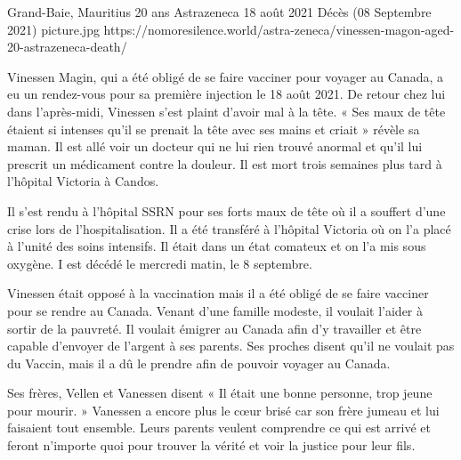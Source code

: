 {Grand-Baie, Mauritius}
{20 ans}
{Astrazeneca}
{18 août 2021}
{Décès (08 Septembre 2021)}
{picture.jpg}
{https://nomoresilence.world/astra-zeneca/vinessen-magon-aged-20-astrazeneca-death/}
{

Vinessen Magin, qui a été obligé de se faire vacciner pour voyager au Canada, a
eu un rendez-vous pour sa première injection le 18 août 2021. De retour chez lui
dans l’après-midi, Vinessen s’est plaint d’avoir mal à la tête. « Ses maux de
tête étaient si intenses qu’il se prenait la tête avec ses mains et criait »
révèle sa maman. Il est allé voir un docteur qui ne lui rien trouvé anormal et
qu’il lui prescrit un médicament contre la douleur. Il est mort trois semaines
plus tard à l’hôpital Victoria à Candos.

Il s’est rendu à l’hôpital SSRN pour ses forts maux de tête où il a souffert
d’une crise lors de l’hospitalisation. Il a été transféré à l’hôpital Victoria
où on l’a placé à l’unité des soins intensifs. Il était dans un état comateux et
on l’a mis sous oxygène. I est décédé le mercredi matin, le 8 septembre.

Vinessen était opposé à la vaccination mais il a été obligé de se faire vacciner
pour se rendre au Canada. Venant d’une famille modeste, il voulait l’aider à
sortir de la pauvreté. Il voulait émigrer au Canada afin d’y travailler et être
capable d’envoyer de l’argent à ses parents. Ses proches disent qu’il ne voulait
pas du Vaccin, mais il a dû le prendre afin de pouvoir voyager au Canada.

Ses frères, Vellen et Vanessen disent « Il était une bonne personne, trop jeune
pour mourir. » Vanessen a encore plus le cœur brisé car son frère jumeau et lui
faisaient tout ensemble. Leurs parents veulent comprendre ce qui est arrivé et
feront n’importe quoi pour trouver la vérité et voir la justice pour leur fils.

}
